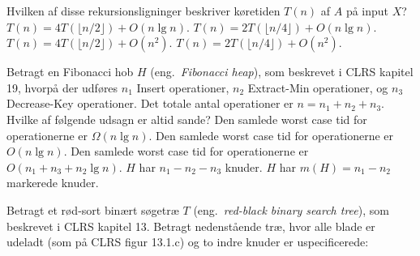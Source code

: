 \medskip 

Hvilken af disse rekursionsligninger beskriver køretiden $T(n)$ af $A$ på input $X$?
\etsvar
\mulighederstart
\svar $T(n) = 4 T(\lfloor n/2\rfloor ) + O(n \lg n)$.
\svar $T(n) = 2 T(\lfloor n/4\rfloor ) + O(n \lg n)$.
\svar $T(n) = 4 T(\lfloor n/2\rfloor ) + O(n^2)$. \korrekt
\svar $T(n) = 2 T(\lfloor n/4\rfloor ) + O(n^2)$.
\mulighederslut
{}



Betragt en Fibonacci hob $H$ (eng.~\emph{Fibonacci heap}), som beskrevet i CLRS kapitel 19, hvorpå der udføres $n_1$ {\sc Insert} operationer, $n_2$ {\sc Extract-Min} operationer, og $n_3$ {\sc Decrease-Key} operationer.
Det totale antal operationer er $n=n_1+n_2+n_3$.
Hvilke af følgende udsagn er altid sande?
\fleresvar
\mulighederstart
\svar Den samlede worst case tid for operationerne er $\Omega(n \lg n)$.
\svar Den samlede worst case tid for operationerne er $O(n \lg n)$. \korrekt
\svar Den samlede worst case tid for operationerne er $O(n_1 + n_3 + n_2 \lg n)$. \korrekt
\svar $H$ har $n_1 - n_2 - n_3$ knuder.
\svar $H$ har $m(H) = n_1 - n_2$ markerede knuder.
\mulighederslut
{}



\label{q:red-black}
Betragt et rød-sort binært søgetræ $T$ (eng.~\emph{red-black binary search tree}), som beskrevet i CLRS kapitel 13.
Betragt nedenstående træ, hvor alle blade er udeladt (som på CLRS figur 13.1.c) og to indre knuder er uspecificerede:

\begin{center}
\end{center}

